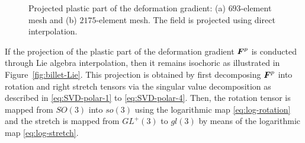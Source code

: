 \documentclass[12pt]{article}
\begin{document}
\begin{figure}[htbp]
  \begin{center}
    \unitlength=1.0mm
    \caption{Projected plastic part of the deformation gradient: (a)
      $693$-element mesh and (b) $2175$-element mesh. The field is projected
      using direct interpolation.}
    \label{fig:billet-no-Lie}
  \end{center}
\end{figure}

If the projection of the plastic part of the deformation gradient ${\boldsymbol{F}}^{p}$ is
conducted through Lie algebra interpolation, then it remains isochoric as
illustrated in Figure~\ref{fig:billet-Lie}. This projection is obtained by first
decomposing ${\boldsymbol{F}}^{p}$ into rotation and right stretch tensors via the singular
value decomposition as described in \eqref{eq:SVD-polar-1} to
\eqref{eq:SVD-polar-4}. Then, the rotation tensor is mapped from $SO(3)$ into
$so(3)$ using the logarithmic map \eqref{eq:log-rotation} and the stretch is
mapped from $GL^{+}(3)$ to $gl(3)$ by means of the logarithmic map
\eqref{eq:log-stretch}.
\end{document}
